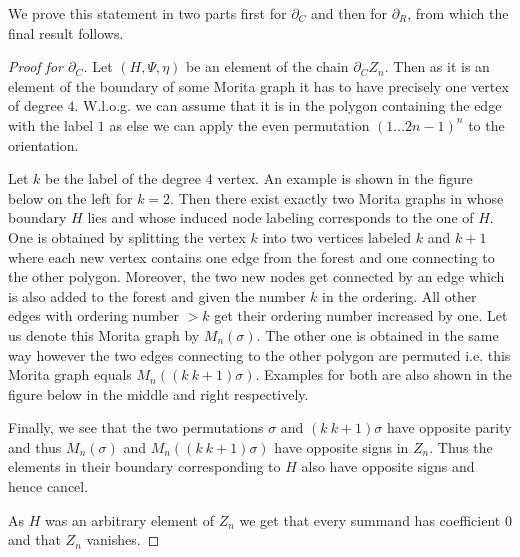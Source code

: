 We prove this statement in two parts first for $\partial_{C}$ and then for $\partial_{R}$, from which the final result follows.


\begin{proof}[Proof for $\partial_C$]
	Let $(H,\Psi,\eta)$ be an element of the chain $\partial_{C} Z_{n}$.
	Then as it is an element of the boundary of some Morita graph it has to
	have precisely one vertex of degree $4$. W.l.o.g. we can assume that it is in the polygon containing the 
	edge with the label $1$ as else we can apply the even permutation $(1 \ldots 2n-1)^{n}$ to the orientation.

	Let $k$ be the label of the degree $4$ vertex. An example is shown in the figure below on the left for $k = 2$. 
	Then there exist exactly two Morita graphs in whose boundary $H$ lies and whose induced node labeling corresponds to the one of $H$.
	One is obtained by splitting the vertex $k$ into two vertices labeled $k$ and $k+1$ where each new vertex contains one edge from the forest and one connecting to the other polygon.
	Moreover, the two new nodes get connected by an edge which is also added to the forest and given the number $k$ in the ordering.
	All other edges with ordering number  $> k $ get their ordering number increased by one. Let us denote this Morita graph by $M_{n}(\sigma)$.
	The other one is obtained in the same way however the two edges connecting to the other polygon are permuted i.e.
	this Morita graph equals $M_{n}((k\ k+1)\sigma)$.
	Examples for both are also shown in the figure below in the middle and right respectively.

	Finally, we see that the two permutations $\sigma$ and $(k\ k+1) \sigma$ have opposite parity and thus $M_{n}(\sigma)$ and $M_{n}((k\ k+1) \sigma)$ have
	opposite signs in $Z_{n}$. Thus the elements in their boundary corresponding to $H$ also have opposite signs and hence cancel.

	As $H$ was an arbitrary element of $Z_{n}$ we get that every summand has coefficient $0$ and that $Z_{n}$ vanishes.
\end{proof}

